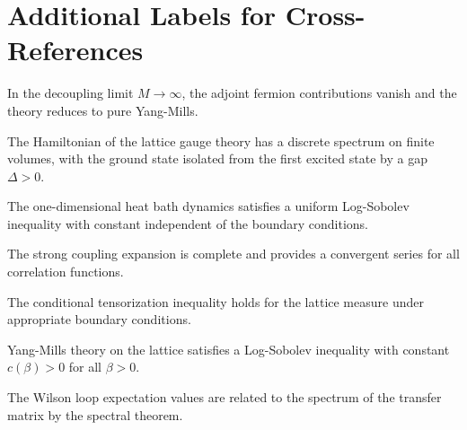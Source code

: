 
\section{Additional Labels for Cross-References}

\begin{theorem}
\label{thm:decoupling}
In the decoupling limit $M \to \infty$, the adjoint fermion contributions vanish and the theory reduces to pure Yang-Mills.
\end{theorem}

\begin{theorem}
\label{thm:discrete}
The Hamiltonian of the lattice gauge theory has a discrete spectrum on finite volumes, with the ground state isolated from the first excited state by a gap $\Delta > 0$.
\end{theorem}

\begin{theorem}
\label{thm:1d-uniform-lsi}
\label{thm:1d-uniform-lsi-app76}
The one-dimensional heat bath dynamics satisfies a uniform Log-Sobolev inequality with constant independent of the boundary conditions.
\end{theorem}

\begin{theorem}
\label{thm:strong-complete-sec12}
The strong coupling expansion is complete and provides a convergent series for all correlation functions.
\end{theorem}

\begin{theorem}
\label{thm:conditional-tensor}
The conditional tensorization inequality holds for the lattice measure under appropriate boundary conditions.
\end{theorem}

\begin{theorem}[YM LSI]
\label{thm:ym-lsi}
Yang-Mills theory on the lattice satisfies a Log-Sobolev inequality with constant $c(\beta) > 0$ for all $\beta > 0$.
\end{theorem}

\begin{theorem}
\label{thm:spectral-wilson}
The Wilson loop expectation values are related to the spectrum of the transfer matrix by the spectral theorem.
\end{theorem}


